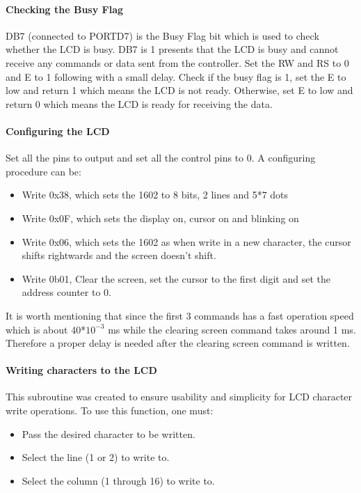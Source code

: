 \documentclass[]{report}
\begin{document}
\paragraph{Checking the Busy Flag}
DB7 (connected to PORTD7) is the Busy Flag bit which is used to check whether the LCD is busy. DB7 is 1 presents that the LCD is busy and cannot receive any commands or data sent from the controller. \newline
Set the RW and RS to 0 and E to 1 following with a small delay. Check if the busy flag is 1, set the E to low and return 1 which means the LCD is not ready. Otherwise, set E to low and return 0 which means the LCD is ready for receiving the data.

\paragraph{Configuring the LCD}
Set all the pins to output and set all the control pins to 0. A configuring procedure can be:
\begin{itemize}
	\item Write 0x38, which sets the 1602 to 8 bits, 2 lines and 5*7 dots
	\item Write 0x0F, which sets the display on, cursor on and blinking on
	\item Write 0x06, which sets the 1602 as when write in a new character, the cursor shifts rightwards and the screen doesn't shift.
	\item Write 0b01, Clear the screen, set the cursor to the first digit and set the address counter to 0.
\end{itemize}

     It is worth mentioning that since the first 3 commands has a fast operation speed which is about 40*$10^{-3}$ ms while the clearing screen command takes around 1 ms.  Therefore a proper delay is needed after the clearing screen command is written.

\paragraph{Writing characters to the LCD}
This subroutine was created to ensure usability and simplicity for LCD character write operations.
To use this function, one must:
\begin{itemize}
\item Pass the desired character to be written.
\item Select the line (1 or 2) to write to.
\item Select the column (1 through 16) to write to.
\end{itemize}
\end{document}
